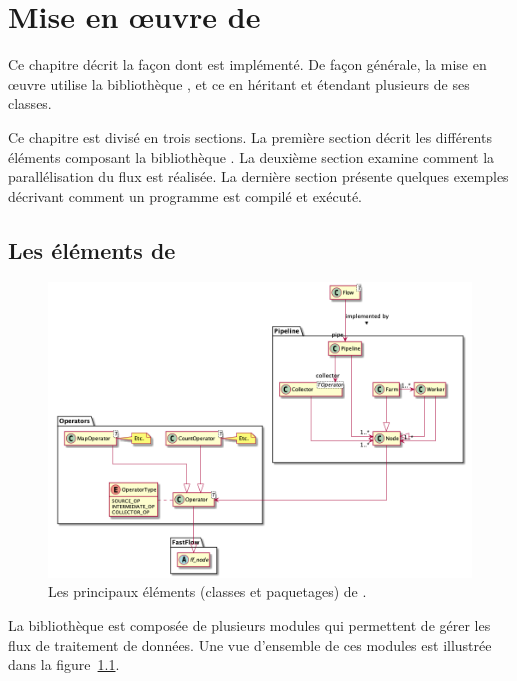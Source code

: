 
\chapter{Mise en \oe{}uvre de \PpFf}
\label{implementation.chap}


Ce chapitre décrit la fa\c{c}on dont  est impl\'ement\'e. 
%
De fa\c{c}on g\'en\'erale, la mise en \oe{}uvre utilise la biblioth\`eque , et ce en h\'eritant et \'etendant plusieurs de ses classes.

Ce chapitre est divis\'e en trois sections.
%
La premi\`ere section d\'ecrit les diff\'erents éléments composant la biblioth\`eque . La deuxi\`eme section examine comment la parall\'elisation du flux est r\'ealis\'ee. La derni\`ere section pr\'esente quelques exemples d\'ecrivant comment un programme \PpFf{} est compil\'e et ex\'ecut\'e.


\section{Les \'el\'ements de }

\begin{figure}
\centering
         \includegraphics[width=1.0\textwidth]{Figures/vueEnsemble.png}
      \caption{Les principaux éléments (classes et paquetages) de .}
       \label{All.fig}
\end{figure}

La biblioth\`eque  est compos\'ee de plusieurs modules qui permettent de g\'erer les flux de traitement de donn\'ees. Une vue d'ensemble de ces modules est illustr\'ee dans la figure~\ref{All.fig}.

